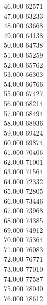 { 46.000	62571 \\
 47.000	63233 \\
 48.000	63668 \\
 49.000	64138 \\
 50.000	64738 \\
 51.000	65259 \\
 52.000	65762 \\
 53.000	66303 \\
 54.000	66766 \\
 55.000	67427 \\
 56.000	68214 \\
 57.000	68494 \\
 58.000	68936 \\
 59.000	69424 \\
 60.000	69874 \\
 61.000	70406 \\
 62.000	71001 \\
 63.000	71564 \\
 64.000	72332 \\
 65.000	72805 \\
 66.000	73446 \\
 67.000	73968 \\
 68.000	74385 \\
 69.000	74912 \\
 70.000	75364 \\
 71.000	76083 \\
 72.000	76771 \\
 73.000	77010 \\
 74.000	77587 \\
 75.000	78040 \\
 76.000	78612 \\
}
